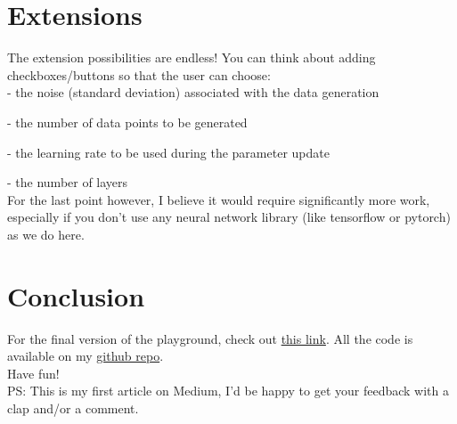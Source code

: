 \section{Extensions}

The extension possibilities are endless! You can think about adding checkboxes/buttons so that the user can choose: \\

- the noise (standard deviation) associated with the data generation

- the number of data points to be generated

- the learning rate to be used during the parameter update

- the number of layers \\

For the last point however, I believe it would require significantly more work, especially if you don't use any neural network library (like tensorflow or pytorch) as we do here. \\

\section{Conclusion}

For the final version of the playground, check out \href{https://nn-playground-app.herokuapp.com/}{this link}. All the code is available on my \href{https://github.com/savoga/nn-playground-from-scratch/}{github repo}. \\

Have fun! \\

PS: This is my first article on Medium, I'd be happy to get your feedback with a clap and/or a comment. \\